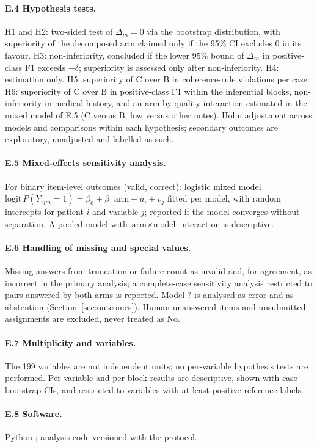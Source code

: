 \paragraph{E.4 Hypothesis tests.} H1 and H2: two-sided test of $\Delta_m = 0$ via the bootstrap distribution, with
superiority of the decomposed arm claimed only if the 95\% CI excludes 0 in its favour. H3: non-inferiority, concluded if
the lower 95\% bound of $\Delta_m$ in positive-class F1 exceeds $-\delta$; superiority is assessed only after
non-inferiority. H4: estimation only. H5: superiority of C over B in coherence-rule violations per case. H6: superiority of C over
B in positive-class F1 within the inferential blocks, non-inferiority in medical history, and an arm-by-quality
interaction estimated in the mixed model of E.5 (C versus B, low versus other notes). Holm adjustment across
models and comparisons within each hypothesis; secondary outcomes are exploratory, unadjusted and labelled as
such.

\paragraph{E.5 Mixed-effects sensitivity analysis.} For binary item-level outcomes (valid, correct): logistic mixed
model $\text{logit}\,P(Y_{ijm}=1) = \beta_0 + \beta_1\,\text{arm} + u_i + v_j$ fitted per model, with random intercepts for
patient $i$ and variable $j$; reported if the model converges without separation. A pooled model with
$\text{arm}\times\text{model}$ interaction is descriptive.

\paragraph{E.6 Handling of missing and special values.} Missing answers from truncation or failure count as invalid
and, for agreement, as incorrect in the primary analysis; a complete-case sensitivity analysis restricted to pairs
answered by both arms is reported. Model ? is analysed as error and as abstention (Section~\ref{sec:outcomes}). Human
unanswered items and unsubmitted assignments are excluded, never treated as No.

\paragraph{E.7 Multiplicity and variables.} The 199 variables are not independent units; no per-variable hypothesis
tests are performed. Per-variable and per-block results are descriptive, shown with case-bootstrap CIs, and restricted
to variables with at least  positive reference labels.

\paragraph{E.8 Software.} Python ; analysis code versioned with the protocol. 
